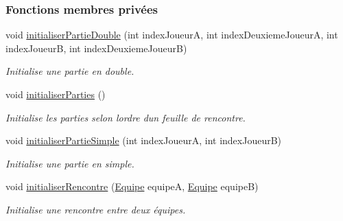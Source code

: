 \subsubsection*{Fonctions membres privées}
\begin{DoxyCompactItemize}
\item 
void \hyperlink{classcom_1_1example_1_1area_1_1_rencontre_a5dd70b0d58f74626bdb4bd21a21d661c}{initialiser\+Partie\+Double} (int index\+JoueurA, int index\+Deuxieme\+JoueurA, int index\+JoueurB, int index\+Deuxieme\+JoueurB)
\begin{DoxyCompactList}\small\item\em Initialise une partie en double. \end{DoxyCompactList}\item 
void \hyperlink{classcom_1_1example_1_1area_1_1_rencontre_a9af98788b76483567c06eac9a02418c5}{initialiser\+Parties} ()
\begin{DoxyCompactList}\small\item\em Initialise les parties selon l\textquotesingle{}ordre d\textquotesingle{}un feuille de rencontre. \end{DoxyCompactList}\item 
void \hyperlink{classcom_1_1example_1_1area_1_1_rencontre_afe8119a55e348caf296514d604718646}{initialiser\+Partie\+Simple} (int index\+JoueurA, int index\+JoueurB)
\begin{DoxyCompactList}\small\item\em Initialise une partie en simple. \end{DoxyCompactList}\item 
void \hyperlink{classcom_1_1example_1_1area_1_1_rencontre_a61ff55a4fb128654aec0456d5b3adaa3}{initialiser\+Rencontre} (\hyperlink{classcom_1_1example_1_1area_1_1_equipe}{Equipe} equipeA, \hyperlink{classcom_1_1example_1_1area_1_1_equipe}{Equipe} equipeB)
\begin{DoxyCompactList}\small\item\em Initialise une rencontre entre deux équipes. \end{DoxyCompactList}\end{DoxyCompactItemize}
